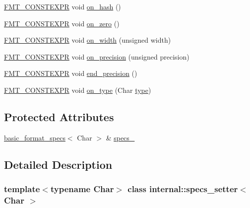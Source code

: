 \begin{DoxyCompactItemize}
\item 
\hyperlink{core_8h_a69201cb276383873487bf68b4ef8b4cd}{F\+M\+T\+\_\+\+C\+O\+N\+S\+T\+E\+X\+PR} void \hyperlink{classinternal_1_1specs__setter_a12f25749c2b49114584989052b12e3b3}{on\+\_\+hash} ()
\item 
\hyperlink{core_8h_a69201cb276383873487bf68b4ef8b4cd}{F\+M\+T\+\_\+\+C\+O\+N\+S\+T\+E\+X\+PR} void \hyperlink{classinternal_1_1specs__setter_a28b738cdad316052c678a94897019eb7}{on\+\_\+zero} ()
\item 
\hyperlink{core_8h_a69201cb276383873487bf68b4ef8b4cd}{F\+M\+T\+\_\+\+C\+O\+N\+S\+T\+E\+X\+PR} void \hyperlink{classinternal_1_1specs__setter_afade8ebe9da33d1acbd67f733728c9b3}{on\+\_\+width} (unsigned width)
\item 
\hyperlink{core_8h_a69201cb276383873487bf68b4ef8b4cd}{F\+M\+T\+\_\+\+C\+O\+N\+S\+T\+E\+X\+PR} void \hyperlink{classinternal_1_1specs__setter_ac97e11a521b65d2f1662ffcf745c60be}{on\+\_\+precision} (unsigned precision)
\item 
\hyperlink{core_8h_a69201cb276383873487bf68b4ef8b4cd}{F\+M\+T\+\_\+\+C\+O\+N\+S\+T\+E\+X\+PR} void \hyperlink{classinternal_1_1specs__setter_a5d15aa0f82408448ef56bdba6f6e4394}{end\+\_\+precision} ()
\item 
\hyperlink{core_8h_a69201cb276383873487bf68b4ef8b4cd}{F\+M\+T\+\_\+\+C\+O\+N\+S\+T\+E\+X\+PR} void \hyperlink{classinternal_1_1specs__setter_a65d55d770b5953558ce0b582e95cdcf7}{on\+\_\+type} (Char \hyperlink{namespaceinternal_a8661864098ac0acff9a6dd7e66f59038}{type})
\end{DoxyCompactItemize}
\subsection*{Protected Attributes}
\begin{DoxyCompactItemize}
\item 
\hyperlink{structbasic__format__specs}{basic\+\_\+format\+\_\+specs}$<$ Char $>$ \& \hyperlink{classinternal_1_1specs__setter_a340e1b2d94403a8f91e741fd9a5bc97a}{specs\+\_\+}
\end{DoxyCompactItemize}


\subsection{Detailed Description}
\subsubsection*{template$<$typename Char$>$\newline
class internal\+::specs\+\_\+setter$<$ Char $>$}




